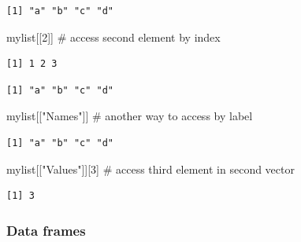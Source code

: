 \documentclass[
  letterpaper,
  DIV=11,
  numbers=noendperiod]{scrreprt}
\newenvironment{Shaded}{\begin{snugshade}}{\end{snugshade}}
\newcommand{\CommentTok}[1]{\textcolor[rgb]{0.37,0.37,0.37}{#1}}
\newcommand{\DecValTok}[1]{\textcolor[rgb]{0.68,0.00,0.00}{#1}}
\newcommand{\NormalTok}[1]{\textcolor[rgb]{0.00,0.23,0.31}{#1}}
\newcommand{\SpecialCharTok}[1]{\textcolor[rgb]{0.37,0.37,0.37}{#1}}
\newcommand{\StringTok}[1]{\textcolor[rgb]{0.13,0.47,0.30}{#1}}
\begin{document}
\begin{verbatim}
[1] "a" "b" "c" "d"
\end{verbatim}

\begin{Shaded}
\begin{Highlighting}[]
\NormalTok{mylist[[}\DecValTok{2}\NormalTok{]] }\CommentTok{\# access second element by index}
\end{Highlighting}
\end{Shaded}

\begin{verbatim}
[1] 1 2 3
\end{verbatim}

\begin{Shaded}
\end{Shaded}

\begin{verbatim}
[1] "a" "b" "c" "d"
\end{verbatim}

\begin{Shaded}
\begin{Highlighting}[]
\NormalTok{mylist[[}\StringTok{"Names"}\NormalTok{]] }\CommentTok{\# another way to access by label}
\end{Highlighting}
\end{Shaded}

\begin{verbatim}
[1] "a" "b" "c" "d"
\end{verbatim}

\begin{Shaded}
\begin{Highlighting}[]
\NormalTok{mylist[[}\StringTok{"Values"}\NormalTok{]][}\DecValTok{3}\NormalTok{]  }\CommentTok{\# access third element in second vector}
\end{Highlighting}
\end{Shaded}

\begin{verbatim}
[1] 3
\end{verbatim}

\hypertarget{data-frames}{%
\subsubsection{Data frames}\label{data-frames}}
\end{document}
